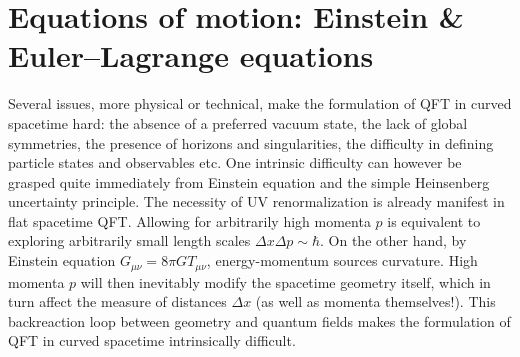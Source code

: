 \section{Equations of motion: Einstein \& Euler--Lagrange equations}


\begin{mytheorem}
Several issues, more physical or technical, make the formulation of QFT in curved spacetime hard: the absence of a preferred vacuum state, the lack of global symmetries, the presence of horizons and singularities, the difficulty in defining particle states and observables etc.
One intrinsic difficulty can however be grasped quite immediately from Einstein equation and the simple Heinsenberg uncertainty principle.
The necessity of UV renormalization is already manifest in flat spacetime QFT.
Allowing for arbitrarily high momenta $p$ is equivalent to exploring arbitrarily small length scales $\Delta x \Delta p \sim \hbar$.
On the other hand, by Einstein equation $G_{\mu\nu} = 8\pi G T_{\mu\nu}$, energy-momentum sources curvature.
High momenta $p$ will then inevitably modify the spacetime geometry itself, which in turn affect the measure of distances $\Delta x$ (as well as momenta themselves!).
This backreaction loop between geometry and quantum fields makes the formulation of QFT in curved spacetime intrinsically difficult.
\end{mytheorem}


